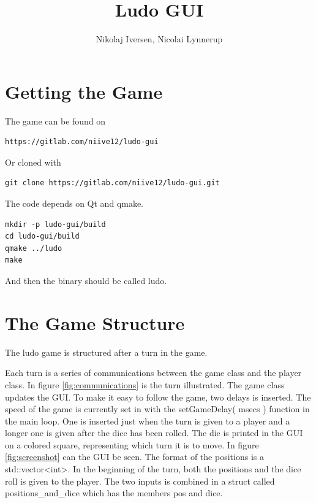 \documentclass[a4paper,10pt]{article}
\title{Ludo GUI}
\author{Nikolaj Iversen, Nicolai Lynnerup}
\begin{document}
\maketitle

\section{Getting the Game}
The game can be found on
\begin{verbatim}
https://gitlab.com/niive12/ludo-gui
\end{verbatim}
Or cloned with
\begin{verbatim}
git clone https://gitlab.com/niive12/ludo-gui.git
\end{verbatim}
The code depends on Qt and qmake.
\begin{verbatim}
mkdir -p ludo-gui/build
cd ludo-gui/build
qmake ../ludo
make
\end{verbatim}
And then the binary should be called ludo.

\section{The Game Structure}
The ludo game is structured after a turn in the game.

Each turn is a series of communications between the game class and the player class.
In figure \ref{fig:communications} is the turn illustrated.
The game class updates the GUI.
To make it easy to follow the game, two delays is inserted.
The speed of the game is currently set in with the setGameDelay( msecs ) function in the main loop.
One is inserted just when the turn is given to a player and a longer one is given after the dice has been rolled.
The die is printed in the GUI on a colored square, representing which turn it is to move.
In figure \ref{fig:screenshot} can the GUI be seen.
The format of the positions is a std::vector<int>.
In the beginning of the turn, both the positions and the dice roll is given to the player.
The two inputs is combined in a struct called positions\_and\_dice which has the members pos and dice.
\end{document}
